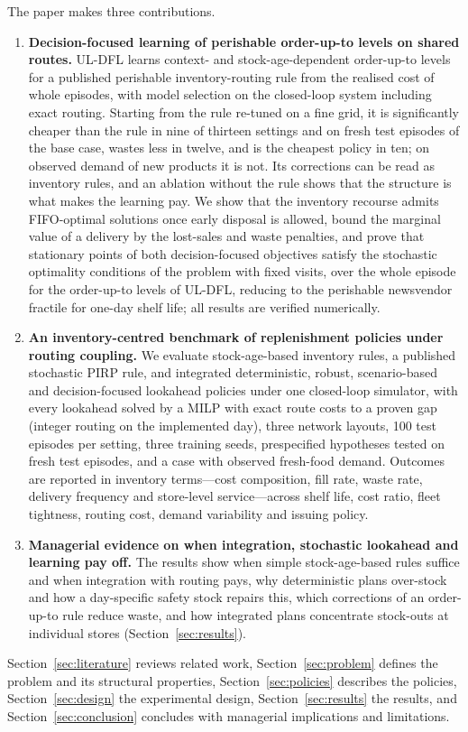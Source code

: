 The paper makes three contributions.
\begin{enumerate}[leftmargin=*]
\item \textbf{Decision-focused learning of perishable order-up-to levels on shared routes.} UL-DFL learns context- and stock-age-dependent order-up-to levels for a published perishable inventory-routing rule from the realised cost of whole episodes, with model selection on the closed-loop system including exact routing. Starting from the rule re-tuned on a fine grid, it is significantly cheaper than the rule in nine of thirteen settings and on fresh test episodes of the base case, wastes less in twelve, and is the cheapest policy in ten; on observed demand of new products it is not. Its corrections can be read as inventory rules, and an ablation without the rule shows that the structure is what makes the learning pay. We show that the inventory recourse admits FIFO-optimal solutions once early disposal is allowed, bound the marginal value of a delivery by the lost-sales and waste penalties, and prove that stationary points of both decision-focused objectives satisfy the stochastic optimality conditions of the problem with fixed visits, over the whole episode for the order-up-to levels of UL-DFL, reducing to the perishable newsvendor fractile for one-day shelf life; all results are verified numerically.
\item \textbf{An inventory-centred benchmark of replenishment policies under routing coupling.} We evaluate stock-age-based inventory rules, a published stochastic PIRP rule, and integrated deterministic, robust, scenario-based and decision-focused lookahead policies under one closed-loop simulator, with every lookahead solved by a MILP with exact route costs to a proven gap (integer routing on the implemented day), three network layouts, 100 test episodes per setting, three training seeds, prespecified hypotheses tested on fresh test episodes, and a case with observed fresh-food demand. Outcomes are reported in inventory terms---cost composition, fill rate, waste rate, delivery frequency and store-level service---across shelf life, cost ratio, fleet tightness, routing cost, demand variability and issuing policy.
\item \textbf{Managerial evidence on when integration, stochastic lookahead and learning pay off.} The results show when simple stock-age-based rules suffice and when integration with routing pays, why deterministic plans over-stock and how a day-specific safety stock repairs this, which corrections of an order-up-to rule reduce waste, and how integrated plans concentrate stock-outs at individual stores (Section~\ref{sec:results}).
\end{enumerate}

Section~\ref{sec:literature} reviews related work, Section~\ref{sec:problem} defines the problem and its structural properties, Section~\ref{sec:policies} describes the policies, Section~\ref{sec:design} the experimental design, Section~\ref{sec:results} the results, and Section~\ref{sec:conclusion} concludes with managerial implications and limitations.
